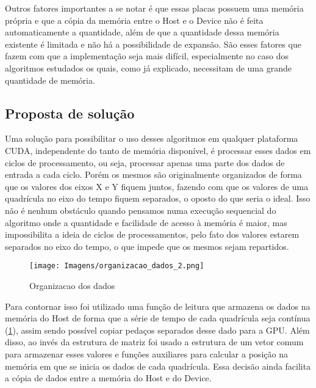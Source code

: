Outros fatores importantes a se notar é que essas placas possuem uma memória própria e que a cópia da memória entre o Host e o Device não é feita automaticamente a quantidade, além de que a quantidade dessa memória existente é limitada e não há a possibilidade de expansão. São esses fatores que fazem com que a implementação seja mais difícil, especialmente no caso dos algoritmos estudados os quais, como já explicado, necessitam de uma grande quantidade de memória.

\subsection{Proposta de solução}\label{cap:proposta_solucao}

Uma solução para possibilitar o uso desses algoritmos em qualquer plataforma CUDA, independente do tanto de memória disponível, é processar esses dados em ciclos de processamento, ou seja, processar apenas uma parte dos dados de entrada a cada ciclo. Porém os mesmos são originalmente organizados de forma que os valores dos eixos X e Y fiquem juntos, fazendo com que os valores de uma quadrícula no eixo do tempo fiquem separados, o oposto do que seria o ideal. Isso não é nenhum obstáculo quando pensamos numa execução sequencial do algoritmo onde a quantidade e facilidade de acesso à memória é maior, mas impossibilita a ideia de ciclos de processamentos, pelo fato dos valores estarem separados no eixo do tempo, o que impede que os mesmos sejam repartidos.

\begin{figure}[H]
\centering
\texttt{[image: Imagens/organizacao\_dados\_2.png]}
\caption{Organizacao dos dados}
\label{fig:organizacao_dados_2}
\end{figure}

Para contornar isso foi utilizado uma função de leitura que armazena os dados na memória do Host de forma que a série de tempo de cada quadrícula seja contínua (\ref{fig:organizacao_dados_2}), assim sendo possível copiar pedaços separados desse dado para a GPU. Além disso, ao invés da estrutura de matriz foi usado a estrutura de um vetor comum para armazenar esses valores e funções auxiliares para calcular a posição na memória em que se inicia os dados de cada quadrícula. Essa decisão ainda facilita a cópia de dados entre a memória do Host e do Device.

